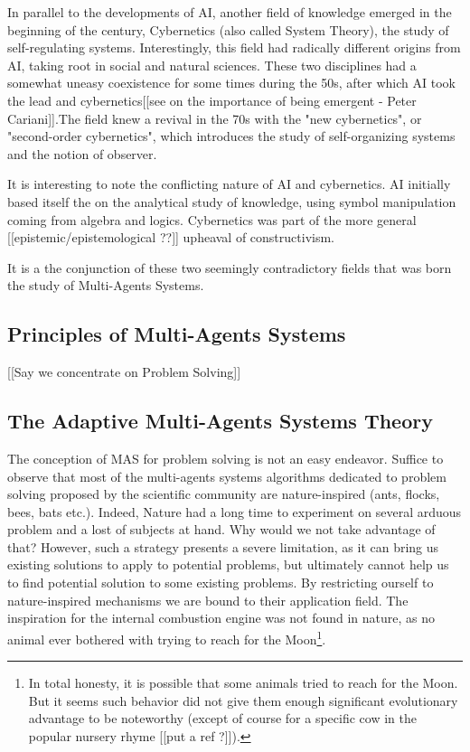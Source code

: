 In parallel to the developments of AI, another field of knowledge emerged in the beginning of the century, Cybernetics (also called System Theory), the study of self-regulating systems. Interestingly, this field had radically different origins from AI, taking root in social and natural sciences. These two disciplines had a somewhat uneasy coexistence for some times during the 50s, after which AI took the lead and cybernetics[[see on the importance of being emergent - Peter Cariani]].The field knew a revival in the 70s with the "new cybernetics", or "second-order cybernetics", which introduces the study of self-organizing systems and the notion of observer.

It is interesting to note the conflicting nature of AI and cybernetics. AI initially based itself the  on the analytical study of knowledge, using symbol manipulation coming from algebra and logics. Cybernetics was part of the more general [[epistemic/epistemological ??]] upheaval of constructivism.

It is a the conjunction of these two seemingly contradictory fields that was born the study of Multi-Agents Systems.

\subsection{Principles of Multi-Agents Systems}

[[Say we concentrate on Problem Solving]]

\subsection{The Adaptive Multi-Agents Systems Theory}

The conception of MAS for problem solving is not an easy endeavor. Suffice to observe that most of the multi-agents systems algorithms dedicated to problem solving proposed by the scientific community are nature-inspired (ants, flocks, bees, bats etc.). Indeed, Nature had a long time to experiment on several arduous problem and a lost of subjects at hand. Why would we not take advantage of that? However, such a strategy presents a severe limitation, as it can bring us existing solutions to apply to potential problems, but ultimately cannot help us to find potential solution to some existing problems. By restricting ourself to nature-inspired mechanisms we are bound to their application field.
The inspiration for the internal combustion engine was not found in nature, as no animal ever bothered with trying to reach for the Moon\footnote{In total honesty, it is possible that some animals tried to reach for the Moon. But it seems such behavior did not give them enough significant evolutionary advantage to be noteworthy (except of course for a specific cow in the popular nursery rhyme [[put a ref ?]]).}.


